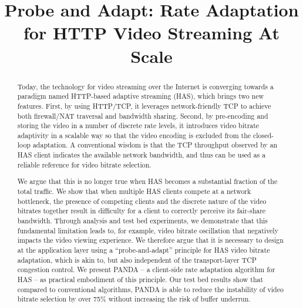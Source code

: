 \documentclass[conference]{IEEEtran}
\theoremstyle{plain}
\theoremstyle{definition}
\theoremstyle{plain}
\theoremstyle{plain}
\begin{document}
\title{{\Huge Probe and Adapt: Rate Adaptation for HTTP Video Streaming
At Scale}}





\author{ }










\maketitle

\begin{abstract}
Today, the technology for video streaming over the Internet is converging
towards a paradigm named HTTP-based adaptive streaming (HAS), which
brings two new features. First, by using HTTP/TCP, it leverages network-friendly
TCP to achieve both firewall/NAT traversal and bandwidth sharing.
Second, by pre-encoding and storing the video in a number of discrete
rate levels, it introduces video bitrate adaptivity in a scalable
way so that the video encoding is excluded from the closed-loop adaptation.
A conventional wisdom is that the TCP throughput observed by an HAS
client indicates the available network bandwidth, and thus can be
used as a reliable reference for video bitrate selection.

We argue that this is no longer true when HAS becomes a substantial
fraction of the total traffic. We show that when multiple HAS clients
compete at a network bottleneck, the presence of competing clients
and the discrete nature of the video bitrates together result in difficulty
for a client to correctly perceive its fair-share bandwidth. Through
analysis and test bed experiments, we demonstrate that this fundamental
limitation leads to, for example, video bitrate oscillation that negatively
impacts the video viewing experience. We therefore argue that it is
necessary to design at the application layer using a ``probe-and-adapt''
principle for HAS video bitrate adaptation, which is akin to, but
also independent of the transport-layer TCP congestion control. We
present PANDA -- a client-side rate adaptation algorithm for HAS --
as practical embodiment of this principle. Our test bed results show
that compared to conventional algorithms, PANDA is able to reduce
the instability of video bitrate selection by over 75\% without increasing
the risk of buffer underrun.
\end{abstract}
\end{document}
